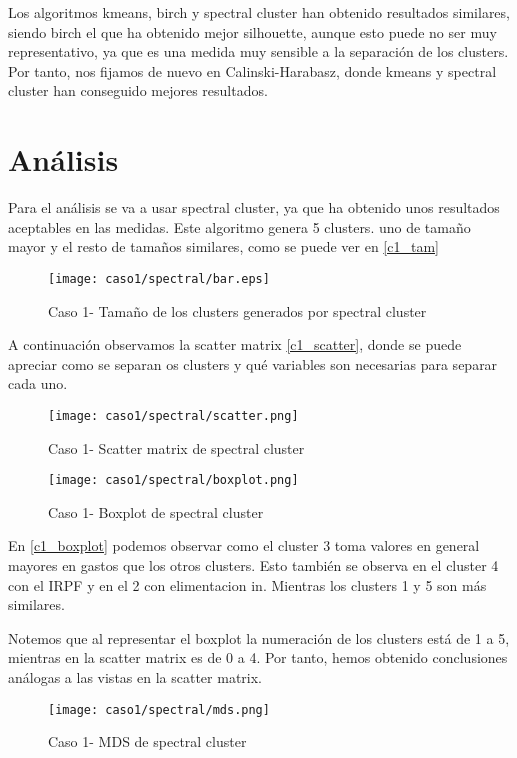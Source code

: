 Los algoritmos kmeans, birch y spectral cluster han obtenido resultados similares, siendo birch el que ha obtenido mejor silhouette, aunque esto puede no ser muy representativo, ya que es una medida muy sensible a la separación de los clusters. Por tanto, nos fijamos de nuevo en Calinski-Harabasz, donde kmeans y spectral cluster han conseguido mejores resultados.


\section{Análisis}


Para el análisis se va a usar spectral cluster, ya que ha obtenido unos resultados aceptables en las medidas. Este algoritmo genera 5 clusters. uno de tamaño mayor y el resto de tamaños similares, como se puede ver en \eqref{c1_tam}

\begin{figure}[ht]
\caption{Caso 1- Tamaño de los clusters generados por spectral cluster}
\label{c1_tam}
\texttt{[image: caso1/spectral/bar.eps]}
\end{figure}

A continuación observamos la scatter matrix \eqref{c1_scatter}, donde se puede apreciar como se separan os clusters y qué variables son necesarias para separar cada uno.

\begin{figure}[ht]
\caption{Caso 1- Scatter matrix de spectral cluster}
\label{c1_scatter}
\texttt{[image: caso1/spectral/scatter.png]}
\end{figure}


\begin{figure}[ht]
\caption{Caso 1- Boxplot de spectral cluster}
\label{c1_boxplot}
\texttt{[image: caso1/spectral/boxplot.png]}
\end{figure}

En \eqref{c1_boxplot} podemos observar como el cluster 3 toma valores en general mayores en gastos que los otros clusters. Esto también se observa en el cluster 4 con el IRPF y en el 2 con elimentacion in. Mientras los clusters 1 y 5 son más similares.

Notemos que al representar el boxplot la numeración de los clusters está de 1 a 5, mientras en la scatter matrix es de 0 a 4. Por tanto, hemos obtenido conclusiones análogas a las vistas en la scatter matrix.

\begin{figure}[ht]
\caption{Caso 1- MDS de spectral cluster}
\label{c1_mds}
\texttt{[image: caso1/spectral/mds.png]}
\end{figure}

